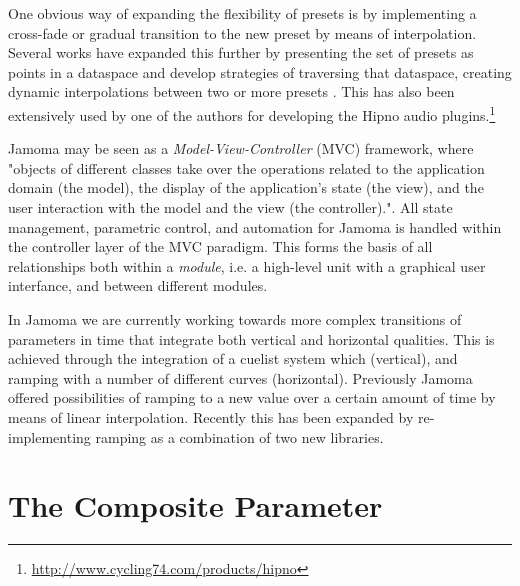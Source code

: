 \documentclass{article}
\begin{document}
One obvious way of expanding the flexibility of presets is by implementing a cross-fade or gradual transition to the new preset by means of interpolation. Several works have expanded this further by presenting the set of presets as points in a dataspace and develop strategies of traversing that dataspace, creating dynamic interpolations between two or more presets \cite{Dahlstedt:2001,Momeni:2003, Bencina:2005metasurface}. This has also been extensively used by one of the authors for developing the Hipno audio plugins.\footnote{\url{http://www.cycling74.com/products/hipno}}


Jamoma may be seen as a \emph{Model-View-Controller} (MVC) framework, where "objects of different classes take over the operations related to the application domain (the model), the display of the application's state (the view), and the user interaction with the model and the view (the controller)."\cite[p26]{Krasner:1988}. All state management, parametric control, and automation for Jamoma is handled within the controller layer of the MVC paradigm. This forms the basis of all relationships both within a \emph{module}, i.e. a high-level unit with a graphical user interfance, and between different modules.

In Jamoma we are currently working towards more complex transitions of parameters in time that integrate both vertical and horizontal qualities. This is achieved through the integration of a cuelist system which (vertical), and ramping with a number of different curves (horizontal). Previously Jamoma offered possibilities of ramping to a new value over a certain amount of time by means of linear interpolation. Recently this has been expanded by re-implementing ramping as a combination of two new libraries. 






\section{The Composite Parameter} %
\label{sec:the_composite_parameter}
\end{document}
